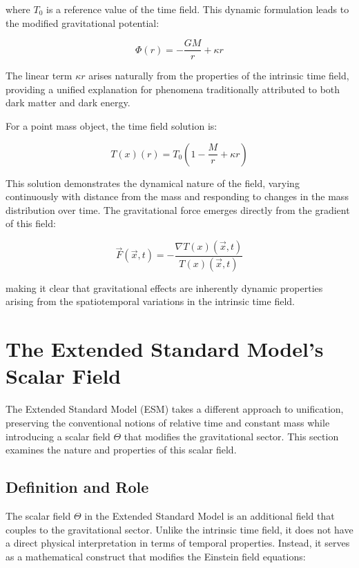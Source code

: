 \documentclass[12pt,a4paper]{article}
\newcommand{\Tfield}{T(x)}
\newcommand{\Tzero}{T_0}
\newcommand{\vecx}{\vec{x}}
\begin{document}
	where \(\Tzero\) is a reference value of the time field. This dynamic formulation leads to the modified gravitational potential:
	
	\begin{equation}
		\Phi(r) = -\frac{GM}{r} + \kappa r
	\end{equation}
	
	The linear term \(\kappa r\) arises naturally from the properties of the intrinsic time field, providing a unified explanation for phenomena traditionally attributed to both dark matter and dark energy. 
	
	For a point mass object, the time field solution is:
	
	\begin{equation}
		\Tfield(r) = \Tzero\left(1 - \frac{M}{r} + \kappa r\right)
	\end{equation}
	
	This solution demonstrates the dynamical nature of the field, varying continuously with distance from the mass and responding to changes in the mass distribution over time. The gravitational force emerges directly from the gradient of this field:
	
	\begin{equation}
		\vec{F}(\vecx,t) = -\frac{\nabla\Tfield(\vecx,t)}{\Tfield(\vecx,t)}
	\end{equation}
	
	making it clear that gravitational effects are inherently dynamic properties arising from the spatiotemporal variations in the intrinsic time field.
	
	\section{The Extended Standard Model's Scalar Field}
	\label{sec:esm_scalar_field}
	
	The Extended Standard Model (ESM) takes a different approach to unification, preserving the conventional notions of relative time and constant mass while introducing a scalar field \(\Theta\) that modifies the gravitational sector. This section examines the nature and properties of this scalar field.
	
	\subsection{Definition and Role}
	\label{subsec:scalar_field_definition}
	
	The scalar field \(\Theta\) in the Extended Standard Model is an additional field that couples to the gravitational sector. Unlike the intrinsic time field, it does not have a direct physical interpretation in terms of temporal properties. Instead, it serves as a mathematical construct that modifies the Einstein field equations:
	
\end{document}
